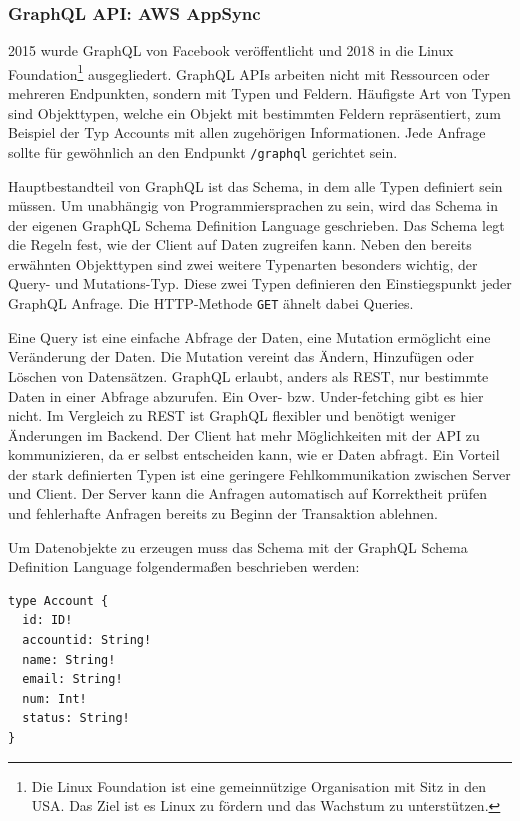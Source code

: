 \subsubsection{GraphQL API: AWS AppSync}
\label{GraphQL}
2015 wurde GraphQL von Facebook veröffentlicht und 2018 in die Linux Foundation\footnote{Die Linux Foundation ist eine gemeinnützige Organisation mit Sitz in den USA.
Das Ziel ist es Linux zu fördern und das Wachstum zu unterstützen.} ausgegliedert.
GraphQL APIs arbeiten nicht mit Ressourcen oder mehreren Endpunkten, sondern mit Typen und Feldern.
Häufigste Art von Typen sind Objekttypen, welche ein Objekt mit bestimmten Feldern repräsentiert, zum Beispiel der Typ Accounts mit allen zugehörigen Informationen.
Jede Anfrage sollte für gewöhnlich an den Endpunkt \verb+/graphql+ gerichtet sein.

Hauptbestandteil von GraphQL ist das Schema, in dem alle Typen definiert sein müssen.
Um unabhängig von Programmiersprachen zu sein, wird das Schema in der eigenen GraphQL Schema Definition Language geschrieben.
Das Schema legt die Regeln fest, wie der Client auf Daten zugreifen kann.
Neben den bereits erwähnten Objekttypen sind zwei weitere Typenarten besonders wichtig, der Query- und Mutations-Typ.
Diese zwei Typen definieren den Einstiegspunkt jeder GraphQL Anfrage.
Die HTTP-Methode \verb+GET+ ähnelt dabei Queries. \cite{GraphQL1}

Eine Query ist eine einfache Abfrage der Daten, eine Mutation ermöglicht eine Veränderung der Daten.
Die Mutation vereint das Ändern, Hinzufügen oder Löschen von Datensätzen.
GraphQL erlaubt, anders als REST, nur bestimmte Daten in einer Abfrage abzurufen. Ein Over- bzw. Under-fetching gibt es hier nicht.
Im Vergleich zu REST ist GraphQL flexibler und benötigt weniger Änderungen im Backend.
Der Client hat mehr Möglichkeiten mit der API zu kommunizieren, da er selbst entscheiden kann, wie er Daten abfragt.
Ein Vorteil der stark definierten Typen ist eine geringere Fehlkommunikation zwischen Server und Client.
Der Server kann die Anfragen automatisch auf Korrektheit prüfen und fehlerhafte Anfragen bereits zu Beginn der Transaktion ablehnen.

Um Datenobjekte zu erzeugen muss das Schema mit der GraphQL Schema Definition Language folgendermaßen beschrieben werden:
\begin{lstlisting}[basicstyle=\ttfamily, breaklines=true , frame = single, backgroundcolor=\color{flashwhite} ]
type Account {
  id: ID!
  accountid: String!
  name: String!
  email: String!
  num: Int!
  status: String!
}
\end{lstlisting}


